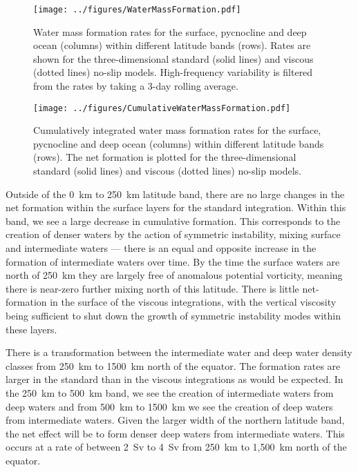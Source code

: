 \begin{figure} 
    \centering
    \texttt{[image: ../figures/WaterMassFormation.pdf]}
    \caption{Water mass formation rates for the surface, pycnocline and deep ocean (columns) within different latitude bands (rows). Rates are shown for the three-dimensional standard (solid lines) and viscous (dotted lines) no-slip models. High-frequency variability is filtered from the rates by taking a 3-day rolling average.}
    \label{fig:WaterMassFormation}
\end{figure}

\begin{figure} 
    \centering
    \texttt{[image: ../figures/CumulativeWaterMassFormation.pdf]}
    \caption{Cumulatively integrated water mass formation rates for the surface, pycnocline and deep ocean (columns) within different latitude bands (rows). The net formation is plotted for the three-dimensional standard (solid lines) and viscous (dotted lines) no-slip models.}
    \label{fig:CumulativeWaterMassFormation}
\end{figure}

Outside of the 0~km to 250~km latitude band, there are no large changes in the net formation within the surface layers for the standard integration. Within this band, we see a large decrease in cumulative formation. This corresponds to the creation of denser waters by the action of symmetric instability, mixing surface and intermediate waters --- there is an equal and opposite increase in the formation of intermediate waters over time. By the time the surface waters are north of 250~km they are largely free of anomalous potential vorticity, meaning there is near-zero further mixing north of this latitude. There is little net-formation in the surface of the viscous integrations, with the vertical viscosity being sufficient to shut down the growth of symmetric instability modes within these layers.

There is a transformation between the intermediate water and deep water density classes from 250~km to 1500~km north of the equator. The formation rates are larger in the standard than in the viscous integrations as would be expected. In the 250~km to 500~km band, we see the creation of intermediate waters from deep waters and from 500~km to 1500~km we see the creation of deep waters from intermediate waters. Given the larger width of the northern latitude band, the net effect will be to form denser deep waters from intermediate waters. This occurs at a rate of between 2~Sv to 4~Sv from 250~km to 1,500~km north of the equator.


